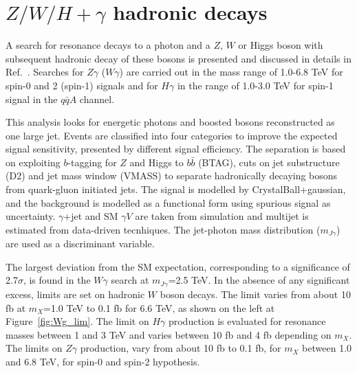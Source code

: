 \documentclass{PoS}
\begin{document}
\section{$Z/W/H+\gamma$ hadronic decays}
\label{sec:gV}
A search for resonance decays to a photon and a $Z$, $W$ or Higgs boson with subsequent hadronic decay of these bosons is presented and discussed in details in Ref.~\cite{EXOT-2016-30}. 
Searches for $Z\gamma$ ($W\gamma$) are carried out in the mass range of 1.0-6.8 TeV for spin-0 and 2 (spin-1) signals and for $H\gamma$ in the range of 1.0-3.0 TeV for spin-1 signal in the $q\bar{q}A$ channel.

This analysis looks for energetic photons and boosted bosons reconstructed as one large jet.
Events are classified into four categories to improve the expected signal sensitivity, presented by different signal efficiency. 
The separation is based on exploiting $b$-tagging for $Z$ and Higgs to $b\bar{b}$ (BTAG), cuts on jet substructure (D2) and jet mass window (VMASS) to separate hadronically decaying bosons from quark-gluon initiated jets.
The signal is modelled by CrystalBall+gaussian, and the background is modelled as a functional form using spurious signal as uncertainty. $\gamma$+jet and SM $\gamma V$ are taken from simulation and multijet is estimated from data-driven tecnhiques.
The jet-photon mass distribution ($m_{J \gamma}$) are used as a discriminant variable. %

The largest deviation from the SM expectation, corresponding to a significance of 2.7$\sigma$, is found in the $W\gamma$ search at $m_{J \gamma}$=2.5 TeV.
In the absence of any significant excess, limits are set on hadronic $W$ boson decays.
The limit varies from about 10 fb at $m_X$=1.0 TeV to 0.1 fb for 6.6 TeV, as shown on the left at Figure~\ref{fig:Wg_lim}. 
The limit on $H\gamma$ production is evaluated for resonance masses between 1 and 3 TeV and varies between 10 fb and 4 fb depending on $m_X$.
The limits on $Z\gamma$ production, vary from about 10 fb to 0.1 fb, for $m_X$ between 1.0 and 6.8 TeV, for spin-0 and spin-2 hypothesis. %
\end{document}

